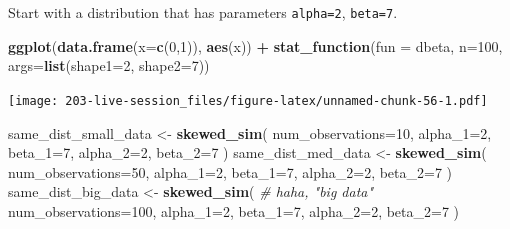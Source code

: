 \documentclass[
]{book}
\newenvironment{Shaded}{\begin{snugshade}}{\end{snugshade}}
\newcommand{\AttributeTok}[1]{\textcolor[rgb]{0.13,0.29,0.53}{#1}}
\newcommand{\CommentTok}[1]{\textcolor[rgb]{0.56,0.35,0.01}{\textit{#1}}}
\newcommand{\DecValTok}[1]{\textcolor[rgb]{0.00,0.00,0.81}{#1}}
\newcommand{\FunctionTok}[1]{\textcolor[rgb]{0.13,0.29,0.53}{\textbf{#1}}}
\newcommand{\NormalTok}[1]{#1}
\newcommand{\OtherTok}[1]{\textcolor[rgb]{0.56,0.35,0.01}{#1}}
\newcommand{\SpecialCharTok}[1]{\textcolor[rgb]{0.81,0.36,0.00}{\textbf{#1}}}
\theoremstyle{definition}
\theoremstyle{definition}
\theoremstyle{definition}
\theoremstyle{definition}
\theoremstyle{remark}
\begin{document}
Start with a distribution that has parameters \texttt{alpha=2}, \texttt{beta=7}.

\begin{Shaded}
\begin{Highlighting}[]
\FunctionTok{ggplot}\NormalTok{(}\FunctionTok{data.frame}\NormalTok{(}\AttributeTok{x=}\FunctionTok{c}\NormalTok{(}\DecValTok{0}\NormalTok{,}\DecValTok{1}\NormalTok{)), }\FunctionTok{aes}\NormalTok{(x)) }\SpecialCharTok{+} 
  \FunctionTok{stat\_function}\NormalTok{(}\AttributeTok{fun =}\NormalTok{ dbeta, }\AttributeTok{n=}\DecValTok{100}\NormalTok{, }\AttributeTok{args=}\FunctionTok{list}\NormalTok{(}\AttributeTok{shape1=}\DecValTok{2}\NormalTok{, }\AttributeTok{shape2=}\DecValTok{7}\NormalTok{))}
\end{Highlighting}
\end{Shaded}

\texttt{[image: 203-live-session\_files/figure-latex/unnamed-chunk-56-1.pdf]}

\begin{Shaded}
\begin{Highlighting}[]
\NormalTok{same\_dist\_small\_data }\OtherTok{\textless{}{-}} \FunctionTok{skewed\_sim}\NormalTok{(}
  \AttributeTok{num\_observations=}\DecValTok{10}\NormalTok{, }
  \AttributeTok{alpha\_1=}\DecValTok{2}\NormalTok{, }\AttributeTok{beta\_1=}\DecValTok{7}\NormalTok{, }
  \AttributeTok{alpha\_2=}\DecValTok{2}\NormalTok{, }\AttributeTok{beta\_2=}\DecValTok{7}
\NormalTok{  )}
\NormalTok{same\_dist\_med\_data }\OtherTok{\textless{}{-}} \FunctionTok{skewed\_sim}\NormalTok{(}
  \AttributeTok{num\_observations=}\DecValTok{50}\NormalTok{, }
  \AttributeTok{alpha\_1=}\DecValTok{2}\NormalTok{, }\AttributeTok{beta\_1=}\DecValTok{7}\NormalTok{, }
  \AttributeTok{alpha\_2=}\DecValTok{2}\NormalTok{, }\AttributeTok{beta\_2=}\DecValTok{7}
\NormalTok{  )}
\NormalTok{same\_dist\_big\_data }\OtherTok{\textless{}{-}} \FunctionTok{skewed\_sim}\NormalTok{( }\CommentTok{\# haha, "big data"}
  \AttributeTok{num\_observations=}\DecValTok{100}\NormalTok{, }
  \AttributeTok{alpha\_1=}\DecValTok{2}\NormalTok{, }\AttributeTok{beta\_1=}\DecValTok{7}\NormalTok{, }
  \AttributeTok{alpha\_2=}\DecValTok{2}\NormalTok{, }\AttributeTok{beta\_2=}\DecValTok{7}
\NormalTok{  )}
\end{Highlighting}
\end{Shaded}
\end{document}
